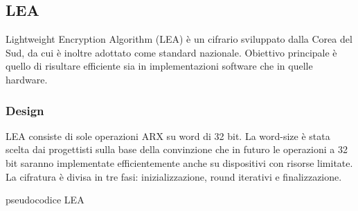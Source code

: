 \documentclass[target=bach,aauheader=,style=]{thud}
\begin{document}
		\subsection{LEA\cite{lea}}
		Lightweight Encryption Algorithm (LEA) è un cifrario sviluppato dalla Corea del Sud, da cui è inoltre adottato come standard nazionale. Obiettivo principale è quello di risultare efficiente sia in implementazioni software che in quelle hardware.
			\subsubsection{Design}
			LEA consiste di sole operazioni ARX su word di 32 bit. La word-size è stata scelta dai progettisti sulla base della convinzione che in futuro le operazioni a 32 bit saranno implementate efficientemente anche su dispositivi con risorse limitate.
			La cifratura è divisa in tre fasi: inizializzazione, round iterativi e finalizzazione.
			\begin{algorithm}
				\caption{pseudocodice LEA}
				\begin{algorithmic}
						\EndFor
					\EndProcedure
				\end{algorithmic}
			\end{algorithm}
			
\end{document}
